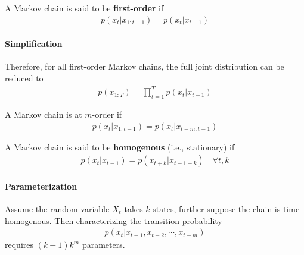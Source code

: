 \documentclass{article}
\begin{document}
	\begin{definition}
		A Markov chain is said to be \textbf{first-order} if 
		\begin{align}
			p\left(x_{t} | x_{1: t-1}\right)=p\left(x_{t} | x_{t-1}\right)
		\end{align}
	\end{definition}
	
	\paragraph{Simplification} Therefore, for all first-order Markov chains, the full joint distribution can be reduced to
	\begin{align}
		p\left(x_{1: T}\right)=\prod_{t=1}^{T} p\left(x_{t} | x_{t-1}\right)
	\end{align}
	
	\begin{definition}
		A Markov chain is at $m$-order if
		\begin{align}
			p\left(x_{t} | x_{1: t-1}\right)=p\left(x_{t} | x_{t-m: t-1}\right)
		\end{align}
	\end{definition}
	
	\begin{definition}
		A Markov chain is said to be \textbf{homogenous} (i.e., stationary) if
		\begin{align}
			p\left(x_{t} | x_{t-1}\right)=p\left(x_{t+k} | x_{t-1+k}\right) \quad \forall t, k
		\end{align}
	\end{definition}
	
	\paragraph{Parameterization} Assume the random variable $X_t$ takes $k$ states, further suppose the chain is time homogenous. Then characterizing the transition probability
	\begin{align}
		p(x_t | x_{t-1}, x_{t-2}, \cdots, x_{t-m})
	\end{align}
	requires $(k-1) k^m$ parameters.
	
\end{document}
